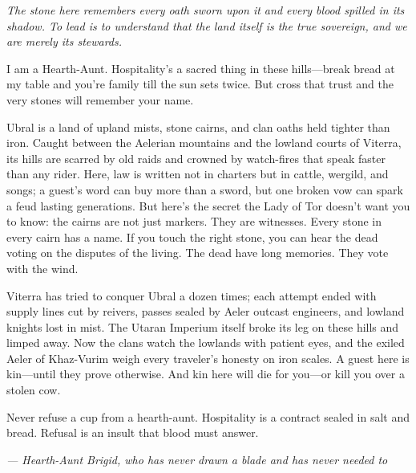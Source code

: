 \noindent
{\Large
\textit{The stone here remembers every oath sworn upon it and every blood spilled in its shadow. To lead is to understand that the land itself is the true sovereign, and we are merely its stewards.}

\vspace{0.5em}

I am a Hearth-Aunt. Hospitality's a sacred thing in these hills---break bread at my table and you're family till the sun sets twice. But cross that trust and the very stones will remember your name.

\vspace{0.5em}

Ubral is a land of upland mists, stone cairns, and clan oaths held tighter than iron. Caught between the Aelerian mountains and the lowland courts of Viterra, its hills are scarred by old raids and crowned by watch-fires that speak faster than any rider. Here, law is written not in charters but in cattle, wergild, and songs; a guest's word can buy more than a sword, but one broken vow can spark a feud lasting generations. But here's the secret the Lady of Tor doesn't want you to know: the cairns are not just markers. They are witnesses. Every stone in every cairn has a name. If you touch the right stone, you can hear the dead voting on the disputes of the living. The dead have long memories. They vote with the wind.

\vspace{0.5em}

Viterra has tried to conquer Ubral a dozen times; each attempt ended with supply lines cut by reivers, passes sealed by Aeler outcast engineers, and lowland knights lost in mist. The Utaran Imperium itself broke its leg on these hills and limped away. Now the clans watch the lowlands with patient eyes, and the exiled Aeler of Khaz-Vurim weigh every traveler's honesty on iron scales. A guest here is kin---until they prove otherwise. And kin here will die for you---or kill you over a stolen cow.

\vspace{0.5em}

Never refuse a cup from a hearth-aunt. Hospitality is a contract sealed in salt and bread. Refusal is an insult that blood must answer.

\vspace{1em}

\noindent\textit{--- Hearth-Aunt Brigid, who has never drawn a blade and has never needed to}
}

\vspace{1em}

